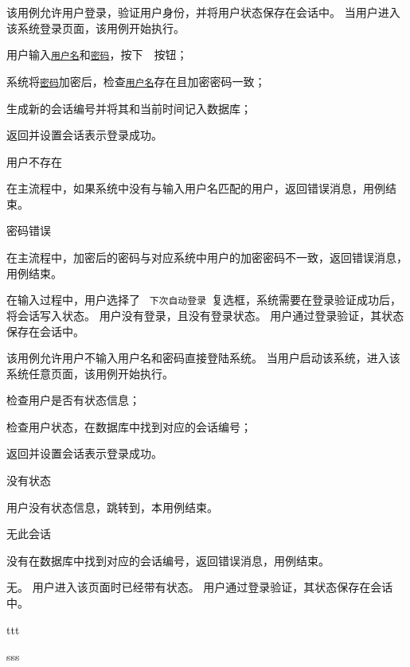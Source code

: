 \documentclass[cs4size,a4paper,nofonts]{ctexart}
\begin{document}
\newcommand{\button}[1]{~\fcolorbox{gray}{white}{\color{black}\bf{#1}}~按钮}
\newcommand{\checkbox}[1]{~%
{\tt{#1}}~复选框}
\newcommand{\textfield}[1]{\underline{\color{darkgray}\tt{#1}}}

{该用例允许用户登录，验证用户身份，并将用户状态保存在会话中。} %
{当用户进入该系统登录页面，该用例开始执行。} %
{
\item 用户输入\textfield{用户名}和\textfield{密码}，按下\button{登录}；
\item 系统将\textfield{密码}加密后，检查\textfield{用户名}存在且加密密码一致；
\item 生成新的会话编号并将其和当前时间记入数据库；
\item 返回并设置会话表示登录成功。
} %
{} %
{
\item 用户不存在\par
在主流程中，如果系统中没有与输入用户名匹配的用户，返回错误消息，用例结束。
\item 密码错误\par
在主流程中，加密后的密码与对应系统中用户的加密密码不一致，返回错误消息，用例结束。
} %
{在输入过程中，用户选择了\checkbox{下次自动登录}，系统需要在登录验证成功后，将会话写入状态。} %
{用户没有登录，且没有登录状态。} %
{用户通过登录验证，其状态保存在会话中。} %

{该用例允许用户不输入用户名和密码直接登陆系统。} %
{当用户启动该系统，进入该系统任意页面，该用例开始执行。} %
{
\item 检查用户是否有状态信息；
\item 检查用户状态，在数据库中找到对应的会话编号；
\item 返回并设置会话表示登录成功。
} %
{} %
{
\item 没有状态\par
用户没有状态信息，跳转到，本用例结束。
\item 无此会话\par
没有在数据库中找到对应的会话编号，返回错误消息，用例结束。
} %
{无。} %
{用户进入该页面时已经带有状态。} %
{用户通过登录验证，其状态保存在会话中。} %

\usecasedes{} %
{} %
{} %
{
\item ttt
} %
{} %
{
\item sss
} %
{} %
{} %
{} %
\end{document}
